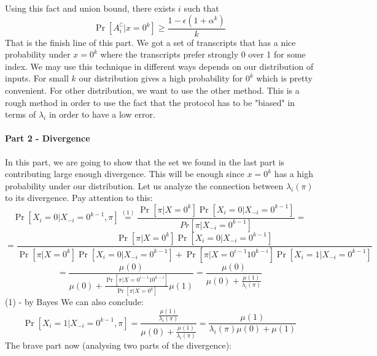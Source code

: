 \documentclass{article}
\theoremstyle{plain}
\begin{document}
Using this fact and union bound, there exists $i$ such that 
\begin{equation*}
    \Pr[A_{i}^\complement| x = 0^k] \geq \frac{1 - \epsilon (1 + \alpha ^k)}{k}
\end{equation*}
That is the finish line of this part. We got a set of transcripts that has a nice probability under $x = 0^k$ where the transcripts prefer strongly 0 over 1 for some index. We may use this technique in different ways depends on our distribution of inputs. For small $k$ our distribution gives a high probability for $0^k$ which is pretty convenient. For other distribution, we want to use the other method. \newline
This is a rough method in order to use the fact that the protocol has to be "biased" in terms of $\lambda_i$ in order to have a low error. \newline
\paragraph{Part 2 - Divergence}
In this part, we are going to show that the set we found in the last part is contributing large enough divergence. This will be enough since $x = 0^k$ has a high probability under our distribution. \newline
Let us analyze the connection between $\lambda_i(\pi)$ to its divergence. \newline
Pay attention to this: \newline
\begin{equation*}
    \Pr[X_i = 0 | X_{-i}=0^{k-1}, \pi] \overset{(1)}{=} \frac{\Pr[\pi | X=0^k]\Pr[X_i=0|X_{-i}=0^{k-1}]}{Pr[\pi|X_{-i} = 0^{k-1}]} = 
\end{equation*}
\begin{equation*}
    = \frac{\Pr[\pi | X=0^k]\Pr[X_i=0|X_{-i}=0^{k-1}]}{\Pr[\pi | X=0^k]\Pr[X_i=0|X_{-i}=0^{k-1}] + \Pr[\pi | X=0^{i-1}10^{k-i}]\Pr[X_i=1|X_{-i}=0^{k-1}]}
\end{equation*}
\begin{equation*}
 =  \frac{\mu(0)}{\mu(0) + \frac{\Pr[\pi | X=0^{i-1}10^{k-i}]}{\Pr[\pi | X=0^k]}\mu(1)} = \frac{\mu(0)}{\mu(0) + \frac{\mu(1)}{\lambda_i(\pi)}} 
\end{equation*} 
(1) - by Bayes \newline
We can also conclude: \newline
\begin{equation*}
\Pr[X_i = 1 | X_{-i}=0^{k-1}, \pi]  = \frac{\frac{\mu(1)}{\lambda_i(\pi)}}{\mu(0) + \frac{\mu(1)}{\lambda_i(\pi)}} = \frac{\mu(1)}{\lambda_i(\pi)\mu(0) + \mu(1)}
\end{equation*}
The brave part now (analysing two parts of the divergence): \newline
\end{document}
